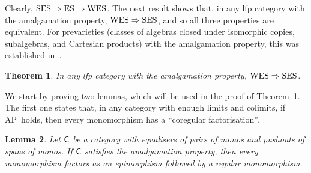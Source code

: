 \documentclass[a4paper,10pt,reqno]{amsart}
\newtheorem{theorem}{Theorem}[section]
\newtheorem{lemma}[theorem]{Lemma}
\theoremstyle{definition}
\theoremstyle{remark}
\newcommand{\cat}{{\sf C}}								%
\newcommand{\IMP}{\Rightarrow}						%
\newcommand{\ES}{\textnormal{ES}}
\newcommand{\WES}{\textnormal{WES}}
\newcommand{\SES}{\textnormal{SES}}
\newcommand{\AP}{\textnormal{AP}}
\begin{document}
Clearly, $\SES\IMP\ES\IMP\WES$. The next result shows that, in any lfp category with the amalgamation property, ${\WES\IMP\SES}$, and so all three properties are equivalent.
%
 For prevarieties (classes of algebras closed under isomorphic copies, subalgebras, and Cartesian products) with the amalgamation property, this was established in~\cite[Theorem~1.3]{BMR2017}. 

\begin{theorem}\label{t:WES-to-SES}
In any lfp category with the amalgamation property, ${\WES\IMP\SES}$.
\end{theorem}


We start by proving two lemmas, which will be used in the proof of Theorem~\ref{t:WES-to-SES}. The first one states that, in any category with enough limits and colimits, if \AP~holds, then every monomorphism has a ``coregular factorisation''.

\begin{lemma}\label{l:epi-reg-mono-for-monos}
	Let $\cat$ be a category with equalisers of pairs of monos and pushouts of spans of monos. If $\cat$ satisfies the amalgamation property, then every monomorphism factors as an epimorphism followed by a regular monomorphism.
	\end{lemma}
	
\end{document}
